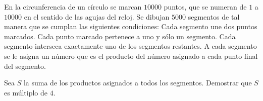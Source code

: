 En la circunferencia de un círculo se marcan $ 10000$ puntos, que se numeran de $ 1$ a $ 10000$ en el sentido de las agujas del reloj. Se dibujan $ 5000$ segmentos de tal manera que se cumplan las siguientes condiciones: Cada segmento une dos puntos marcados. Cada punto marcado pertenece a uno y sólo un segmento. Cada segmento interseca exactamente uno de los segmentos restantes. A cada segmento se le asigna un número que es el producto del número asignado a cada punto final del segmento.

Sea $ S$ la suma de los productos asignados a todos los segmentos.
Demostrar que $ S$ es múltiplo de $ 4$.
